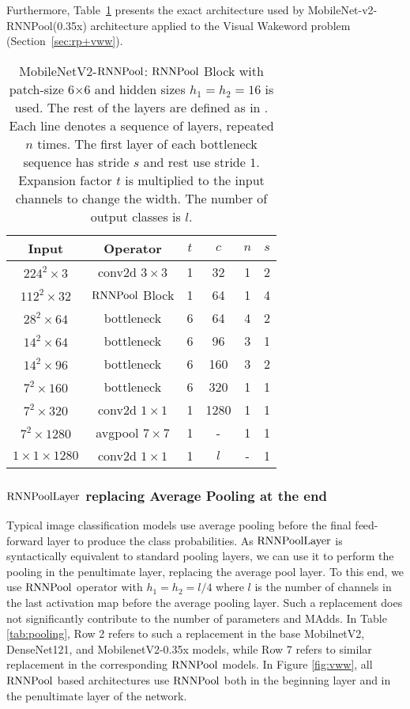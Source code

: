 \documentclass[10pt]{article}
\newcommand{\rpool}{\ensuremath{{\rm RNNPool}}\xspace}
\newcommand{\rpoollayer}{\ensuremath{{\rm RNNPoolLayer}}\xspace}
\newcommand{\alg}{\rpool}
\begin{document}
Furthermore, Table~\ref{tab:mobilenetv2-rp} presents the exact architecture used by MobileNet-v2-RNNPool(0.35x) architecture applied to the Visual Wakeword problem (Section~\ref{sec:rp+vww}).  
\begin{table}[h]
\centering
    \caption{\footnotesize MobileNetV2-\alg : \rpool Block with patch-size 6$\times$6 and hidden sizes $h_1=h_2=16$ is used.
The rest of the layers are defined as in \cite{sandler2018mobilenetv2}. Each line denotes a sequence of
    layers, repeated $n$ times. The first layer of each bottleneck
    sequence has stride $s$ and rest use stride $1$. Expansion factor
    $t$ is multiplied to the input channels to change the width. The number of output classes is $l$.}
    \begin{tabular}{ c | c | c | c | c | c }
      \toprule
	  {Input} & {Operator} & $t$ & $c$ & $n$ & $s$\\
	  \midrule
	  $224^2 \times 3$ & conv2d $3\times3$ & 1 & 32 & 1 & 2\\
	  $112^2 \times 32$ & \alg Block & 1 & 64 & 1 & 4\\
	  $28^2 \times 64$ & bottleneck & 6 & 64 & 4 & 2\\
	  $14^2 \times 64$ & bottleneck & 6 & 96 & 3 & 1\\
	  $14^2 \times 96$ & bottleneck & 6 & 160 & 3 & 2\\
		$7^2 \times 160$ & bottleneck & 6 & 320 & 1 & 1\\
	  $7^2 \times 320$ & conv2d $1\times 1$ & 1 & 1280 & 1 & 1\\
	  $7^2 \times 1280$ & avgpool $7\times 7$ & 1 & - & 1 & 1\\
	  $1 \times 1 \times 1280$ & conv2d $1\times 1$ & 1 & $l$ & - & 1\\
	  \bottomrule
  \end{tabular}
    \label{tab:mobilenetv2-rp}
\end{table} 

\subsubsection{\rpoollayer replacing Average Pooling at the end}
Typical image classification models use average pooling before the final feed-forward layer to produce the class probabilities. As \rpoollayer is syntactically equivalent to standard pooling layers, we can use it to perform the pooling in the penultimate layer, replacing the average pool layer. To this end, we use \rpool operator with  $h_1=h_2=l/4$ where $l$ is the number of channels in the last activation map before the average pooling layer. Such a replacement does not significantly contribute to the number of parameters and MAdds. In Table \ref{tab:pooling}, Row 2 refers to such a replacement in the base MobilnetV2, DenseNet121, and MobilenetV2-0.35x models, while Row 7 refers to similar replacement in the corresponding \rpool models. In Figure \ref{fig:vww}, all \rpool based architectures use \rpool both in the beginning layer and in the penultimate layer of the network. 
\end{document}
